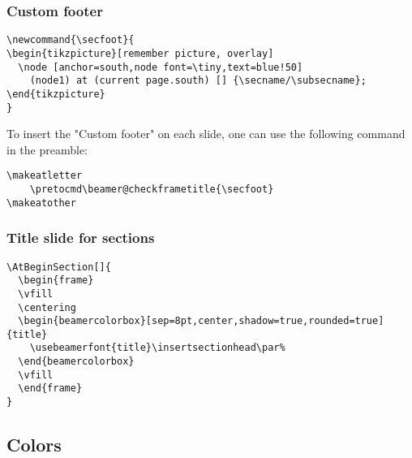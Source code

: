 \subsubsection{Custom footer}
\begin{verbatim}
\newcommand{\secfoot}{
\begin{tikzpicture}[remember picture, overlay]
  \node [anchor=south,node font=\tiny,text=blue!50]
    (node1) at (current page.south) [] {\secname/\subsecname};
\end{tikzpicture}
}
\end{verbatim}
To insert the "Custom footer" on each slide, one can use the following command in the preamble:
\begin{verbatim}
\makeatletter
    \pretocmd\beamer@checkframetitle{\secfoot}
\makeatother
\end{verbatim}

\subsubsection{Title slide for sections}
\begin{verbatim}
\AtBeginSection[]{
  \begin{frame}
  \vfill
  \centering
  \begin{beamercolorbox}[sep=8pt,center,shadow=true,rounded=true]{title}
    \usebeamerfont{title}\insertsectionhead\par%
  \end{beamercolorbox}
  \vfill
  \end{frame}
}
\end{verbatim}

\subsection{Colors}
